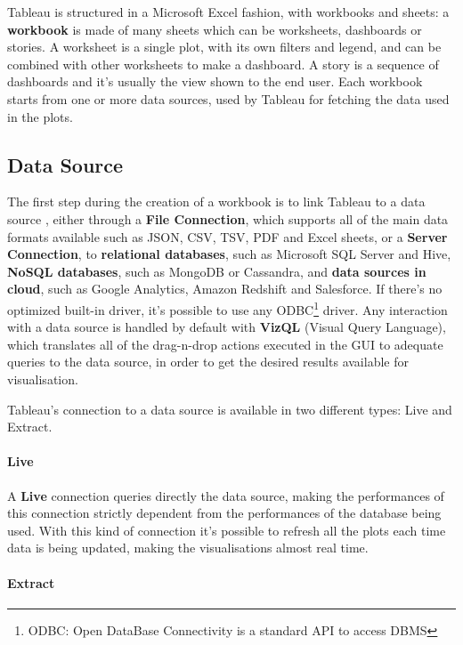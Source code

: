 Tableau is structured in a Microsoft Excel fashion, with workbooks and sheets: a \textbf{workbook} is made of many sheets which can be worksheets, dashboards or stories. A worksheet is a single plot, with its own filters and legend, and can be combined with other worksheets to make a dashboard. A story is a sequence of dashboards and it's usually the view shown to the end user. Each workbook starts from one or more data sources, used by Tableau for fetching the data used in the plots.

\subsection{Data Source}

The first step during the creation of a workbook is to link Tableau to a data source \cite{LearningTableau}, either through a \textbf{File Connection}, which supports all of the main data formats available such as JSON, CSV, TSV, PDF and Excel sheets, or a \textbf{Server Connection}, to \textbf{relational databases}, such as Microsoft SQL Server and Hive, \textbf{NoSQL databases}, such as MongoDB or Cassandra, and \textbf{data sources in cloud}, such as Google Analytics, Amazon Redshift and Salesforce. If there's no optimized built-in driver, it's possible to use any ODBC\footnote{ODBC: Open DataBase Connectivity is a standard API to access DBMS} driver. Any interaction with a data source is handled by default with \textbf{VizQL} (Visual Query Language), which translates all of the drag-n-drop actions executed in the GUI to adequate queries to the data source, in order to get the desired results available for visualisation.

Tableau's connection to a data source is available in two different types: Live and Extract.

\paragraph{Live}

A \textbf{Live} connection queries directly the data source, making the performances of this connection strictly dependent from the performances of the database being used. With this kind of connection it's possible to refresh all the plots each time data is being updated, making the visualisations almost real time.

\paragraph{Extract}

